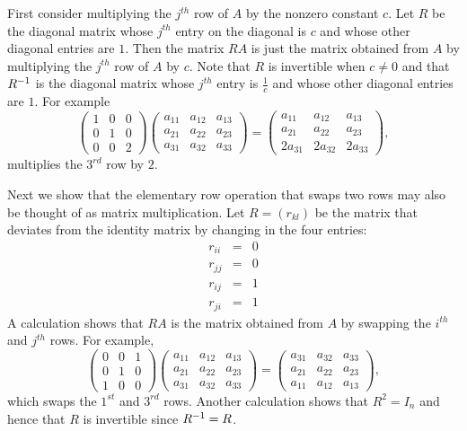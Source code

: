 \proof  First consider multiplying the $j^{th}$ row of $A$ by the
nonzero constant $c$.  Let $R$ be the diagonal matrix whose
$j^{th}$ entry on the diagonal is $c$ and whose other diagonal 
entries are $1$.  Then the matrix $RA$ is just the matrix obtained from 
$A$ by multiplying the $j^{th}$ row of $A$ by $c$.  Note that $R$ is
invertible when $c\neq 0$ and that $R^{-1}$ is the diagonal
matrix whose $j^{th}$ entry is $\frac{1}{c}$ and whose other
diagonal entries are $1$.  For example
\[
\left(\begin{array}{ccc} 1 & 0 & 0\\ 0 & 1 & 0 \\ 0 & 0 & 2\end{array}\right)
\left(\begin{array}{ccc} a_{11} & a_{12} & a_{13}\\ a_{21} & a_{22} & a_{23}
 \\ a_{31} & a_{32} & a_{33} \end{array}\right) =
\left(\begin{array}{ccc} a_{11} & a_{12} & a_{13}\\ a_{21} & a_{22} & a_{23}
 \\ 2a_{31} & 2a_{32} & 2a_{33} \end{array}\right),
\]
multiplies the $3^{rd}$ row by $2$.

Next we show that the elementary row operation that swaps two
rows may also be thought of as matrix multiplication.  Let
$R=(r_{kl})$ be the matrix that deviates from the identity matrix
by changing in the four entries:
\begin{eqnarray*}
r_{ii} & = & 0 \\
r_{jj} & = & 0\\
r_{ij} & = & 1 \\
r_{ji} & = & 1
\end{eqnarray*}
A calculation shows that $RA$ is the matrix obtained from $A$ by
swapping the $i^{th}$ and $j^{th}$ rows.  For example,
\[
\left(\begin{array}{ccc} 0 & 0 & 1\\ 0 & 1 & 0 \\ 1 & 0 & 0\end{array}\right)
\left(\begin{array}{ccc} a_{11} & a_{12} & a_{13}\\ a_{21} & a_{22} & a_{23}
 \\ a_{31} & a_{32} & a_{33} \end{array}\right) =
\left(\begin{array}{ccc} a_{31} & a_{32} & a_{33}\\ a_{21} & a_{22} & a_{23}
 \\  a_{11} & a_{12} & a_{13} \end{array}\right),
\]
which swaps the $1^{st}$ and $3^{rd}$ rows.  Another calculation
shows that $R^2=I_n$ and hence that $R$ is invertible since
$R^{-1}=R$.  

